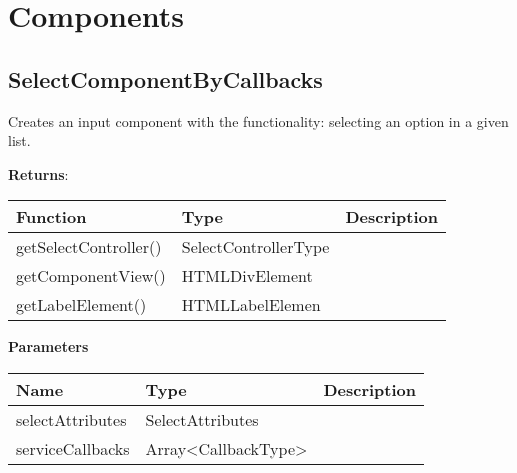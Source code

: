 \clearpage
\section*{Components}

\vspace*{6pt}
\subsection*{SelectComponentByCallbacks}

\vspace*{6pt}
Creates an input component with the functionality: selecting an option in a given list. 

\vspace*{18pt}
\noindent
\textbf{Returns}: 

\begin{table}[!htb] 
    \label{api:selectComponentByCallbacksReturn}
    \footnotesize
    \setlength\extrarowheight{4pt}
    \begin{tabular}{ p{3.5cm} p{3.5cm} p{6cm} }
        \toprule[1.2pt]
        \textbf{Function}     & \textbf{Type}        & \textbf{Description} \\
        \midrule
        getSelectController() & SelectControllerType &  \\
        getComponentView()    & HTMLDivElement       &  \\
        getLabelElement()     & HTMLLabelElemen      &  \\
        \bottomrule[1.2pt]
    \end{tabular}
\end{table}

\vspace*{6pt}
\noindent
\textbf{Parameters}

\begin{table}[!htb] 
    \label{api:selectComponentByCallbacksParameter}
    \footnotesize
    \setlength\extrarowheight{4pt}
    \begin{tabular}{ p{3.5cm} p{3.5cm} p{6cm} }
        \toprule[1.2pt]
        \textbf{Name}    & \textbf{Type}       & \textbf{Description} \\
        \midrule
        selectAttributes & SelectAttributes    &  \\
        serviceCallbacks & Array<CallbackType> &  \\
        \bottomrule[1.2pt]
    \end{tabular}
\end{table}

